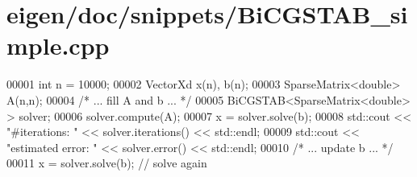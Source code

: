 \hypertarget{eigen_2doc_2snippets_2_bi_c_g_s_t_a_b__simple_8cpp_source}{}\section{eigen/doc/snippets/\+Bi\+C\+G\+S\+T\+A\+B\+\_\+simple.cpp}
\label{eigen_2doc_2snippets_2_bi_c_g_s_t_a_b__simple_8cpp_source}

\begin{DoxyCode}
00001   \textcolor{keywordtype}{int} n = 10000;
00002   VectorXd x(n), b(n);
00003   SparseMatrix<double> A(n,n);
00004   \textcolor{comment}{/* ... fill A and b ... */} 
00005   BiCGSTAB<SparseMatrix<double> > solver;
00006   solver.compute(A);
00007   x = solver.solve(b);
00008   std::cout << \textcolor{stringliteral}{"#iterations:     "} << solver.iterations() << std::endl;
00009   std::cout << \textcolor{stringliteral}{"estimated error: "} << solver.error()      << std::endl;
00010   \textcolor{comment}{/* ... update b ... */}
00011   x = solver.solve(b); \textcolor{comment}{// solve again}
\end{DoxyCode}
